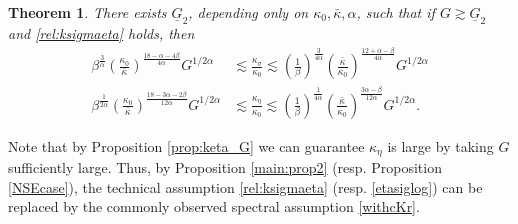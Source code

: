 \documentclass[twoside, reqno]{amsart}
\numberwithin{lemma}{section}
\newtheorem{theorem}{Theorem}
\numberwithin{theorem}{section}
\numberwithin{proposition}{section}
\numberwithin{equation}{section} %
\newcommand{\ka}{\kappa}
\newcommand{\bkap}{\bar{\kap}}
\newcommand{\Gb}{\underline{G}}
\newcommand{\al}{\alpha}
\newcommand{\kap}{\kappa}
\begin{document}
\begin{theorem} \label{main:thm_G_wavenumbers}
   {There exists $\Gb_2$, depending only on $\kap_0,\bkap,\al$, such that if $ G \gtrsim \Gb_2 $ and \eqref{rel:ksigmaeta} holds}, then
    \begin{align} \label{G:ksigma}
      \beta^{\frac{3}{\al}} \left(\frac{\ka_0}{\bar{\ka}}\right)^{\frac{18-\al-4\beta}{4\al}} G^{1/2\alpha} &\lesssim \frac{\ka_\sigma}{\ka_0} \lesssim \left(\frac{1}{\beta}\right)^{\frac{3}{4\al}} \left(\frac{\bar{\ka}}{\ka_0}\right)^{\frac{12+\al-\beta}{4\al}} G^{1/2\alpha}
        \\
        \beta^{\frac{1}{2\al}} \left(\frac{\ka_0}{\bar{\ka}}\right)^{\frac{18-3\al-2\beta}{12\alpha}} G^{1/2\alpha} &\lesssim \frac{\ka_\eta}{\ka_0} \lesssim \left(\frac{1}{\beta}\right)^{\frac{1}{4\al}} \left(\frac{\bar{\ka}}{\ka_0}\right)^{\frac{3\alpha-\beta}{12\alpha}} G^{1/2\alpha}. \label{G:keta}
    \end{align}
\end{theorem}
Note that by Proposition \ref{prop:keta_G} we can guarantee $\ka_\eta$ is large by taking $G$ sufficiently large. {Thus,} by Proposition \ref{main:prop2} (resp. Proposition \ref{NSEcase}), the technical assumption \eqref{rel:ksigmaeta} (resp. \eqref{etasiglog}) can be replaced by the commonly observed spectral assumption \eqref{withcKr}.
\end{document}
